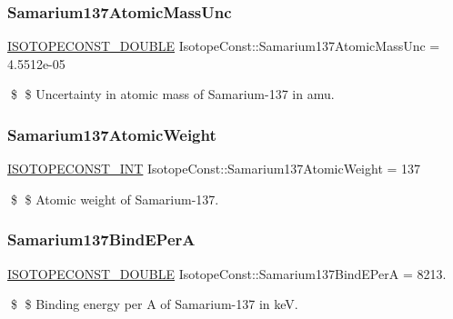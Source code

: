 \subsubsection{\texorpdfstring{Samarium137\+Atomic\+Mass\+Unc}{Samarium137AtomicMassUnc}}
{\footnotesize\ttfamily \mbox{\hyperlink{group___isotope_const-_macros_ga8f45a7272ce02c0b4c65c44636ed719a}{I\+S\+O\+T\+O\+P\+E\+C\+O\+N\+S\+T\+\_\+\+D\+O\+U\+B\+LE}} Isotope\+Const\+::\+Samarium137\+Atomic\+Mass\+Unc = 4.\+5512e-\/05}

\$ \$ Uncertainty in atomic mass of Samarium-\/137 in amu. \mbox{\label{group___isotope_const-_samarium-_sm137_gaec65bdbe4187ae6fd16619bd1eab37a4}} 
\subsubsection{\texorpdfstring{Samarium137\+Atomic\+Weight}{Samarium137AtomicWeight}}
{\footnotesize\ttfamily \mbox{\hyperlink{group___isotope_const-_macros_ga5f18360b3e99483a35c32d789e62621c}{I\+S\+O\+T\+O\+P\+E\+C\+O\+N\+S\+T\+\_\+\+I\+NT}} Isotope\+Const\+::\+Samarium137\+Atomic\+Weight = 137}

\$ \$ Atomic weight of Samarium-\/137. \mbox{\label{group___isotope_const-_samarium-_sm137_ga587d49da46a1a8cc93c510841b0c3963}} 
\subsubsection{\texorpdfstring{Samarium137\+Bind\+E\+PerA}{Samarium137BindEPerA}}
{\footnotesize\ttfamily \mbox{\hyperlink{group___isotope_const-_macros_ga8f45a7272ce02c0b4c65c44636ed719a}{I\+S\+O\+T\+O\+P\+E\+C\+O\+N\+S\+T\+\_\+\+D\+O\+U\+B\+LE}} Isotope\+Const\+::\+Samarium137\+Bind\+E\+PerA = 8213.}

\$ \$ Binding energy per A of Samarium-\/137 in keV. \mbox{\label{group___isotope_const-_samarium-_sm137_ga948d1e61a64982fec780c905cffa6293}} 
